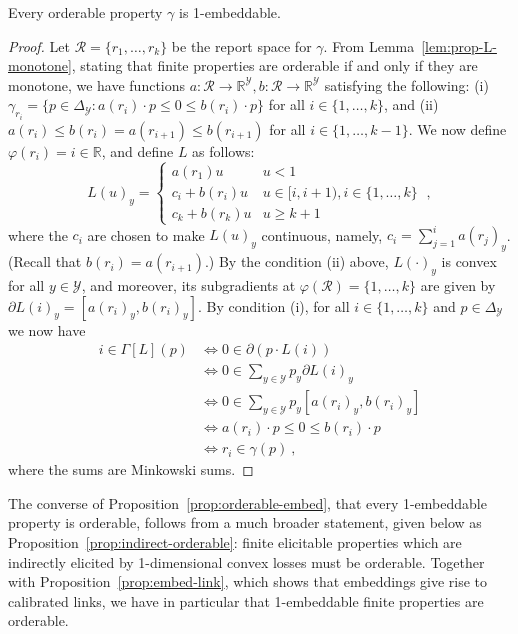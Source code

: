 \documentclass[anon,12pt]{colt2019}
\newcommand{\reals}{\mathbb{R}}
\newcommand{\prop}[1]{\Gamma[#1]}
\newcommand{\simplex}{\Delta_\Y}
\newcommand{\R}{\mathcal{R}}
\newcommand{\Y}{\mathcal{Y}}
\begin{document}
\begin{proposition}\label{prop:orderable-embed}
  Every orderable property $\gamma$ is 1-embeddable.
\end{proposition}
\begin{proof}
  Let $\R = \{r_1,\ldots,r_k\}$ be the report space for $\gamma$.
  From Lemma~\ref{lem:prop-L-monotone}, stating that finite properties are orderable if and only if they are monotone, we have functions $a:\R\to\reals^\Y, b:\R\to\reals^\Y$ satisfying the following: (i) $\gamma_{r_i} = \{p\in\simplex : a(r_i) \cdot p \leq 0 \leq b(r_i) \cdot p\}$ for all $i\in\{1,\ldots,k\}$, and (ii) $a(r_i) \leq b(r_i) = a(r_{i+1}) \leq b(r_{i+1})$ for all $i \in \{1,\ldots,k-1\}$.
  We now define $\varphi(r_i) = i \in \reals$, and define $L$ as follows:
  \begin{equation*}
    L(u)_y =
    \begin{cases}
      a(r_1) u & u < 1 \\
      c_i + b(r_i) u & u \in [i,i+1), i\in\{1,\ldots,k\} \\
      c_k + b(r_k) u & u \geq k+1
    \end{cases}~,
  \end{equation*}
  where the $c_i$ are chosen to make $L(u)_y$ continuous, namely, $c_i = \sum_{j=1}^{i} a(r_j)_y$.
  (Recall that $b(r_i) = a(r_{i+1})$.)
  By the condition (ii) above, $L(\cdot)_y$ is convex for all $y\in\Y$, and moreover, its subgradients at $\varphi(\R) = \{1,\ldots,k\}$ are given by
  $\partial L(i)_y = [a(r_i)_y,b(r_i)_y]$.
  By condition (i), for all $i\in\{1,\ldots,k\}$ and $p\in\simplex$ we now have
  \begin{align*}
    i \in \prop{L}(p)
    &\iff 0 \in \partial (p \cdot L(i)) \\
    &\iff 0 \in \sum_{y\in\Y} p_y \partial L(i)_y \\
    &\iff 0 \in \sum_{y\in\Y} p_y [a(r_i)_y,b(r_i)_y] \\
    &\iff a(r_i) \cdot p \leq 0 \leq b(r_i) \cdot p \\
    &\iff r_i \in \gamma(p)~,
  \end{align*}
  where the sums are Minkowski sums.
\end{proof}

The converse of Proposition~\ref{prop:orderable-embed}, that every 1-embeddable property is orderable, follows from a much broader statement, given below as Proposition~\ref{prop:indirect-orderable}: finite elicitable properties which are indirectly elicited by 1-dimensional convex losses must be orderable.
Together with Proposition~\ref{prop:embed-link}, which shows that embeddings give rise to calibrated links, we have in particular that 1-embeddable finite properties are orderable.
\end{document}
